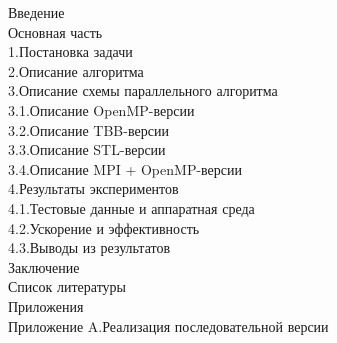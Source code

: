 \documentclass[14pt, a4paper]{extarticle}
\begin{document}
\noindent
Введение  \\
Основная часть  \\
\hspace*{0.5cm}1.\hspace{0.5em}Постановка задачи  \\
\hspace*{0.5cm}2.\hspace{0.5em}Описание алгоритма  \\
\hspace*{0.5cm}3.\hspace{0.5em}Описание схемы параллельного алгоритма  \\
\hspace*{1cm}3.1.\hspace{0.5em}Описание OpenMP-версии  \\
\hspace*{1cm}3.2.\hspace{0.5em}Описание TBB-версии  \\
\hspace*{1cm}3.3.\hspace{0.5em}Описание STL-версии  \\
\hspace*{1cm}3.4.\hspace{0.5em}Описание MPI + OpenMP-версии  \\
\hspace*{0.5cm}4.\hspace{0.5em}Результаты экспериментов  \\
\hspace*{1cm}4.1.\hspace{0.5em}Тестовые данные и аппаратная среда  \\
\hspace*{1cm}4.2.\hspace{0.5em}Ускорение и эффективность  \\
\hspace*{1cm}4.3.\hspace{0.5em}Выводы из результатов  \\
Заключение  \\
Список литературы  \\
Приложения  \\
\hspace*{0.5cm}Приложение A.\hspace{0.5em}Реализация последовательной версии  \\
\end{document}
